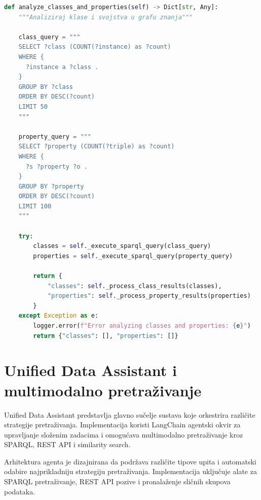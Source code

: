 \begin{lstlisting}[language=Python, caption=Implementacija analize klasa i svojstava]
def analyze_classes_and_properties(self) -> Dict[str, Any]:
    """Analiziraj klase i svojstva u grafu znanja"""
    
    class_query = """
    SELECT ?class (COUNT(?instance) as ?count)
    WHERE {
      ?instance a ?class .
    }
    GROUP BY ?class
    ORDER BY DESC(?count)
    LIMIT 50
    """
    
    property_query = """
    SELECT ?property (COUNT(?triple) as ?count)
    WHERE {
      ?s ?property ?o .
    }
    GROUP BY ?property
    ORDER BY DESC(?count)
    LIMIT 100
    """
    
    try:
        classes = self._execute_sparql_query(class_query)
        properties = self._execute_sparql_query(property_query)
        
        return {
            "classes": self._process_class_results(classes),
            "properties": self._process_property_results(properties)
        }
    except Exception as e:
        logger.error(f"Error analyzing classes and properties: {e}")
        return {"classes": [], "properties": []}
\end{lstlisting}

\section{Unified Data Assistant i multimodalno pretraživanje}

Unified Data Assistant predstavlja glavno sučelje sustava koje orkestrira različite strategije pretraživanja. Implementacija koristi LangChain agentski okvir za upravljanje složenim zadacima i omogućava multimodalno pretraživanje kroz SPARQL, REST API i similarity search.

Arhitektura agenta je dizajnirana da podržava različite tipove upita i automatski odabire najprikladniju strategiju pretraživanja. Implementacija uključuje alate za SPARQL pretraživanje, REST API pozive i pronalaženje sličnih skupova podataka.

